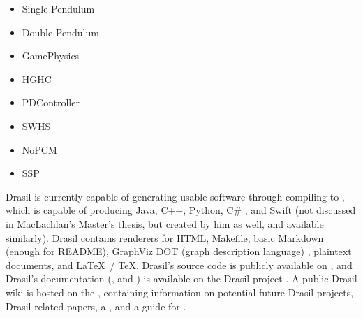 


\begin{itemize}

      \item Single Pendulum

      \item Double Pendulum

      \item GamePhysics

      \item HGHC

      \item PDController

      \item SWHS

      \item NoPCM

      \item SSP

\end{itemize}

Drasil is currently capable of generating usable software through compiling to
, which is capable of producing Java, C++, Python, C\#
\cite{MacLachlan2020}, and Swift (not discussed in MacLachlan's Master's thesis,
but created by him as well, and available similarly). Drasil contains renderers
for HTML, Makefile, basic Markdown (enough for README), GraphViz DOT (graph
description language) , plaintext documents, and \LaTeX\ / \TeX.
Drasil's source code is publicly available on
, and Drasil's
documentation
(,
and
)
is available on the Drasil project
. A public Drasil
wiki is hosted on the , containing information
on potential future Drasil projects, Drasil-related papers, a
, and a
guide for .


